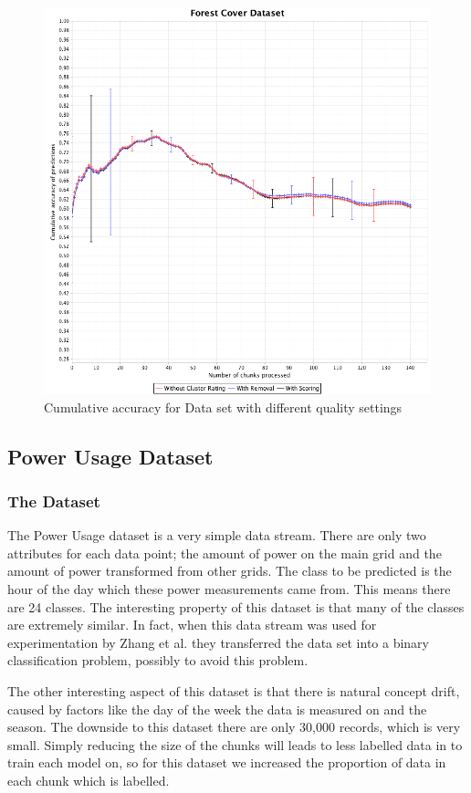 \documentclass[12pt,a4paper,oneside]{report}
\begin{document}
\begin{figure}
	\includegraphics[scale=0.4]{covDataLine}
	\caption{Cumulative accuracy for Data set with different quality settings}
\end{figure}
\subsection*{Power Usage Dataset}
\subsubsection*{The Dataset}
The Power Usage dataset is a very simple data stream. There are only two attributes for each data point; the amount of power on the main grid and the amount of power transformed from other grids. The class to be predicted is the hour of the day which these power measurements came from. This means there are 24 classes. The interesting property of this dataset is that many of the classes are extremely similar. In fact, when this data stream was used for experimentation by Zhang et al.\cite{Zhang} they transferred the data set into a binary classification problem, possibly to avoid this problem. 

The other interesting aspect of this dataset is that there is natural concept drift, caused by factors like the  day of the week the data is measured on and the season. The downside to this dataset there are only 30,000 records, which is very small. Simply reducing the size of the chunks will leads to less labelled data in to train each model on, so for this dataset we increased the proportion of data in each chunk which is labelled. 
\end{document}
